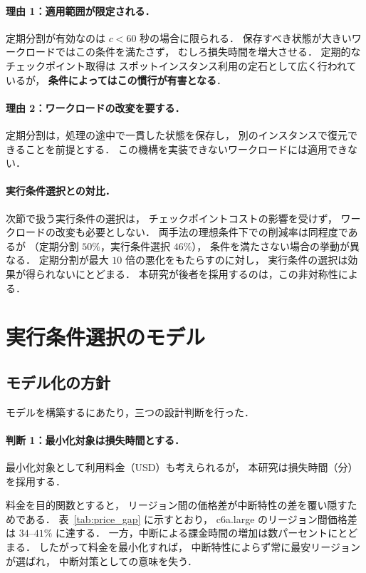 \documentclass[11pt,a4paper]{ltjsreport}
\begin{document}
\paragraph{理由 1：適用範囲が限定される．}
定期分割が有効なのは $c < 60$ 秒の場合に限られる．
保存すべき状態が大きいワークロードではこの条件を満たさず，
むしろ損失時間を増大させる．
定期的なチェックポイント取得は
スポットインスタンス利用の定石として広く行われているが，
\textbf{条件によってはこの慣行が有害となる}．

\paragraph{理由 2：ワークロードの改変を要する．}
定期分割は，処理の途中で一貫した状態を保存し，
別のインスタンスで復元できることを前提とする．
この機構を実装できないワークロードには適用できない．

\paragraph{実行条件選択との対比．}
次節で扱う実行条件の選択は，
チェックポイントコストの影響を受けず，
ワークロードの改変も必要としない．
両手法の理想条件下での削減率は同程度であるが
（定期分割 $50\%$，実行条件選択 $46\%$），
条件を満たさない場合の挙動が異なる．
定期分割が最大 $10$ 倍の悪化をもたらすのに対し，
実行条件の選択は効果が得られないにとどまる．
本研究が後者を採用するのは，この非対称性による．

\section{実行条件選択のモデル}
\label{sec:selection}

\subsection{モデル化の方針}
\label{sec:model_policy}

モデルを構築するにあたり，三つの設計判断を行った．

\paragraph{判断 1：最小化対象は損失時間とする．}
最小化対象として利用料金（USD）も考えられるが，
本研究は損失時間（分）を採用する．

料金を目的関数とすると，
リージョン間の価格差が中断特性の差を覆い隠すためである．
表~\ref{tab:price_gap} に示すとおり，
c6a.large のリージョン間価格差は $34$--$41\%$ に達する．
一方，中断による課金時間の増加は数パーセントにとどまる．
したがって料金を最小化すれば，
中断特性によらず常に最安リージョンが選ばれ，
中断対策としての意味を失う．
\end{document}
